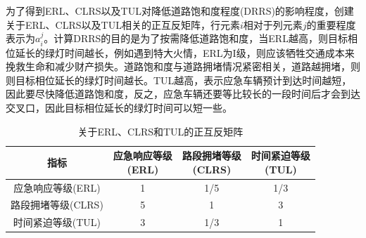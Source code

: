为了得到ERL、CLRS以及TUL对降低道路饱和度程度(DRRS)的影响程度，创建关于ERL、CLRS以及TUL相关的正互反矩阵，行元素${i}$相对于列元素${j}$的重要程度表示为${a_i^j}$。计算DRRS的目的是为了按需降低道路饱和度，当ERL越高，则目标相位延长的绿灯时间越长，例如遇到特大火情，ERL为I级，则应该牺牲交通成本来挽救生命和减少财产损失。道路饱和度与道路拥堵情况紧密相关，道路越拥堵，则则目标相位延长的绿灯时间越长。TUL越高，表示应急车辆预计到达时间越短，因此要尽快降低道路饱和度，反之，应急车辆还要等比较长的一段时间后才会到达交叉口，因此目标相位延长的绿灯时间可以短一些。


\begin{table}[H]
	\centering
	\caption{关于ERL、CLRS和TUL的正互反矩阵}
	\label{table:juzhen}
	\begin{tabular}{|c|c|c|c|}
		\hline
		指标 & \tabincell{c}{应急响应等级\\(ERL)}  & \tabincell{c}{路段拥堵等级\\(CLRS)} & \tabincell{c}{时间紧迫等级\\(TUL)}  \\ \hline
		应急响应等级(ERL) & 1 & 1/5 & 1/3 \\ \hline
		路段拥堵等级(CLRS) & 5 & 1 & 3 \\ \hline
		时间紧迫等级(TUL) & 3 & 1/3 & 1 \\ \hline
	\end{tabular}
\end{table}


